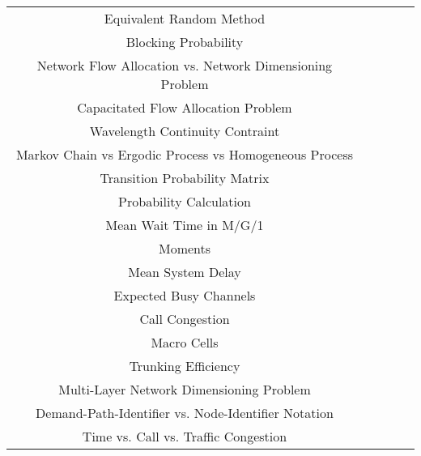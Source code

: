 \documentclass[a4paper]{article}
\begin{document}
\begin{table}[h]
\begin{tabular}{|c||c|c||c|c||}
			Equivalent Random Method & \checkmark &  &
			 & \checkmark \\
			Blocking Probability & \checkmark & \checkmark &
			\checkmark & \checkmark \\
			Network Flow Allocation vs. Network Dimensioning Problem
			&  & \checkmark &
			 & \checkmark \\
			Capacitated Flow Allocation Problem &  &  &
			\checkmark &  \\
			Wavelength Continuity Contraint &  & \checkmark &
			\checkmark &  \\
			Markov Chain vs Ergodic Process vs Homogeneous Process
			&  & \checkmark &
			 & \checkmark \\
			Transition Probability Matrix &  & \checkmark &
			 & \checkmark \\
			Probability Calculation &  & \checkmark &
			 & \checkmark \\
			Mean Wait Time in M/G/1 &  & \checkmark &
			\checkmark & \checkmark \\
			Moments &  & \checkmark &
			\checkmark &  \\
			Mean System Delay &  & \checkmark &
			\checkmark &  \\
			Expected Busy Channels &  &  &
			\checkmark &  \\
			Call Congestion &  & \checkmark &
			\checkmark & \checkmark \\
			Macro Cells &  & \checkmark &
			\checkmark &  \\
			Trunking Efficiency &  &  &
			\checkmark &  \\
			Multi-Layer Network Dimensioning Problem &  &  &
			 & \checkmark \\
			Demand-Path-Identifier vs. Node-Identifier Notation &  &  &
			 & \checkmark \\
			Time vs. Call vs. Traffic Congestion &  &  &
			\checkmark & \checkmark \\
			\hline
			\hline
		\end{tabular}
	\end{table}
\end{document}
